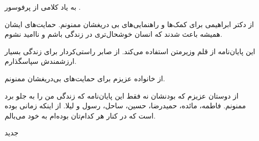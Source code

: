 


\begin{center}
\end{center}

به یاد کلامی از پرفوسور
.

از دکتر ابراهیمی برای کمک‌ها و راهنمایی‌های بی دریغشان ممنونم. حمایت‌های ایشان همیشه باعث شدند که انسان خوشحال‌تری در زندگی باشم و ناامید نشوم.

این پایان‌نامه از قلم وزیرمتن استفاده می‌کند. از صابر راستی‌کردار برای زندگی بسیار ارزشمندش سپاسگذارم.

از خانواده عزیزم برای حمایت‌های بی‌دریغشان ممنونم.

از دوستان عزیزم که بودنشان نه فقط این پایان‌نامه که زندگی من را به جلو برد ممنونم. فاطمه، مائده، حمیدرضا، حسین، ساحل، رسول و لیلا. از اینکه زمانی بوده است که در کنار هر کدام‌تان بوده‌ام به خود می‌بالم.

‌جدید
